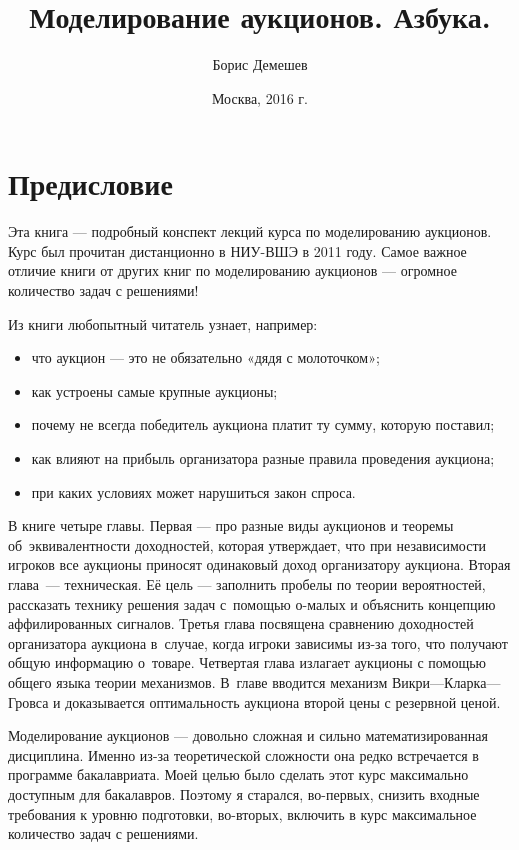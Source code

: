 \documentclass[11pt, openany]{book}
\title{Моделирование аукционов. Азбука. }
\author{Борис Демешев}
\date{Москва, 2016 г.}
\numberwithin{equation}{page} %
\theoremstyle{definition} %
\theoremstyle{definition}
\theoremstyle{definition}
\begin{document}
\maketitle
\tableofcontents{}

\chapter*{Предисловие}

Эта книга — подробный конспект лекций курса по моделированию аукционов. Курс был прочитан дистанционно в НИУ-ВШЭ в 2011 году. Самое важное отличие книги от других книг по моделированию аукционов — огромное количество задач с решениями!

Из книги любопытный читатель узнает, например:
\begin{itemize}
\item что аукцион — это не обязательно «дядя с молоточком»;
\item как устроены самые крупные аукционы;
\item почему не всегда победитель аукциона платит ту сумму, которую поставил;
\item как влияют на прибыль организатора разные правила проведения аукциона;
\item при каких условиях может нарушиться закон спроса.
\end{itemize}

В книге четыре главы. Первая — про разные виды аукционов и теоремы об~эквивалентности доходностей, которая утверждает, что при независимости игроков все аукционы приносят одинаковый доход организатору аукциона. Вторая глава~— техническая. Её цель — заполнить пробелы по теории вероятностей, рассказать технику решения задач с~помощью о-малых и объяснить концепцию аффилированных сигналов. Третья глава посвящена сравнению доходностей организатора аукциона в~случае, когда игроки зависимы из-за того, что получают общую информацию о~товаре. Четвертая глава излагает аукционы с помощью общего языка теории механизмов. В~главе вводится механизм Викри—Кларка—Гровса и доказывается оптимальность аукциона второй цены с резервной ценой.

Моделирование аукционов — довольно сложная и сильно математизированная дисциплина. Именно из-за теоретической сложности она редко встречается в программе бакалавриата. Моей целью было сделать этот курс максимально доступным для бакалавров. Поэтому я старался, во-первых, снизить входные требования к уровню подготовки, во-вторых, включить в курс максимальное количество задач с решениями.
\end{document}
